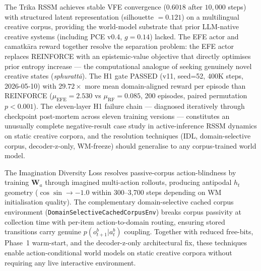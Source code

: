 \documentclass[journal,onecolumn,11pt]{IEEEtran}
\begin{document}
The Trika RSSM achieves stable VFE convergence ($0.6018$ after $10{,}000$ steps)
with structured latent representation (silhouette $= 0.121$) on a multilingual
creative corpus, providing the world-model substrate that prior LLM-native creative
systems (including PCE v0.4, $g{=}0.14$) lacked.
The EFE actor and camatkāra reward together resolve the separation problem:
the EFE actor replaces REINFORCE with an epistemic-value objective that directly
optimises prior entropy increase — the computational analogue of seeking genuinely
novel creative states (\emph{sphurattā}).
The H1 gate PASSED (v11, seed=52, 400K steps, 2026-05-10) with
$29.72{\times}$ more mean domain-aligned reward per episode than REINFORCE
($\mu_{\text{EFE}}{=}2.530$ vs $\mu_{\text{RF}}{=}0.085$, 200 episodes, paired
permutation $p{<}0.001$).
The eleven-layer H1 failure chain --- diagnosed iteratively through checkpoint
post-mortem across eleven training versions — constitutes an unusually complete
negative-result case study in active-inference RSSM dynamics on static creative
corpora, and the resolution techniques (IDL, domain-selective corpus, decoder-z-only,
WM-freeze) should generalise to any corpus-trained world model.

The Imagination Diversity Loss resolves passive-corpus action-blindness by
training $\mathbf{W}_a$ through imagined multi-action rollouts, producing antipodal
$h_t$ geometry ($\cos\!\sin \to -1.0$ within 300--3{,}700 steps depending on WM
initialisation quality).
The complementary domain-selective cached corpus environment
(\texttt{Domain\-Selective\-Cached\-Corpus\-Env}) breaks corpus passivity
at collection time with per-item action-to-domain routing, ensuring stored transitions
carry genuine $p(o_{t+1}^b|a_t^b)$ coupling.
Together with reduced free-bits, Phase~1 warm-start, and the decoder-z-only
architectural fix, these techniques enable action-conditional world models on
static creative corpora without requiring any live interactive environment.
\end{document}

